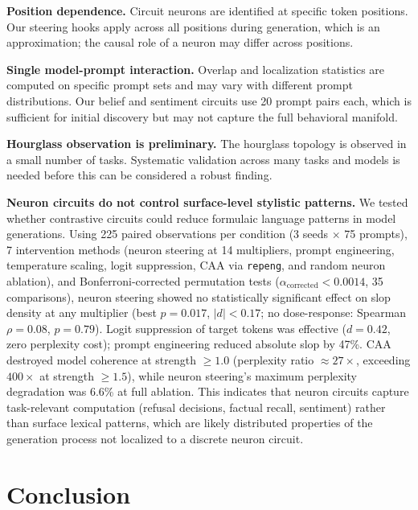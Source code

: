 \documentclass[11pt]{article}
\begin{document}
\textbf{Position dependence.}
Circuit neurons are identified at specific token positions.
Our steering hooks apply across all positions during generation, which is an approximation; the causal role of a neuron may differ across positions.

\textbf{Single model-prompt interaction.}
Overlap and localization statistics are computed on specific prompt sets and may vary with different prompt distributions.
Our belief and sentiment circuits use 20 prompt pairs each, which is sufficient for initial discovery but may not capture the full behavioral manifold.

\textbf{Hourglass observation is preliminary.}
The hourglass topology is observed in a small number of tasks.
Systematic validation across many tasks and models is needed before this can be considered a robust finding.

\textbf{Neuron circuits do not control surface-level stylistic patterns.}
We tested whether contrastive circuits could reduce formulaic language patterns in model generations.
Using 225 paired observations per condition (3 seeds $\times$ 75 prompts), 7 intervention methods (neuron steering at 14 multipliers, prompt engineering, temperature scaling, logit suppression, CAA via \texttt{repeng}, and random neuron ablation), and Bonferroni-corrected permutation tests ($\alpha_{\text{corrected}} < 0.0014$, 35 comparisons), neuron steering showed no statistically significant effect on slop density at any multiplier (best $p = 0.017$, $|d| < 0.17$; no dose-response: Spearman $\rho = 0.08$, $p = 0.79$).
Logit suppression of target tokens was effective ($d = 0.42$, zero perplexity cost); prompt engineering reduced absolute slop by 47\%.
CAA destroyed model coherence at strength $\geq 1.0$ (perplexity ratio $\approx 27\times$, exceeding $400\times$ at strength $\geq 1.5$), while neuron steering's maximum perplexity degradation was 6.6\% at full ablation.
This indicates that neuron circuits capture task-relevant computation (refusal decisions, factual recall, sentiment) rather than surface lexical patterns, which are likely distributed properties of the generation process not localized to a discrete neuron circuit.


\section{Conclusion}
\label{sec:conclusion}
\end{document}
